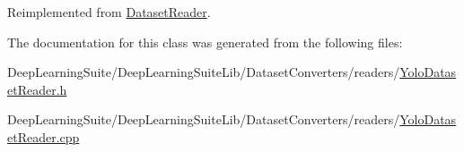Reimplemented from \hyperlink{class_dataset_reader_a732438244cec7c20294f93c6b635888c}{Dataset\+Reader}.



The documentation for this class was generated from the following files\+:\begin{DoxyCompactItemize}
\item 
Deep\+Learning\+Suite/\+Deep\+Learning\+Suite\+Lib/\+Dataset\+Converters/readers/\hyperlink{_yolo_dataset_reader_8h}{Yolo\+Dataset\+Reader.\+h}\item 
Deep\+Learning\+Suite/\+Deep\+Learning\+Suite\+Lib/\+Dataset\+Converters/readers/\hyperlink{_yolo_dataset_reader_8cpp}{Yolo\+Dataset\+Reader.\+cpp}\end{DoxyCompactItemize}
